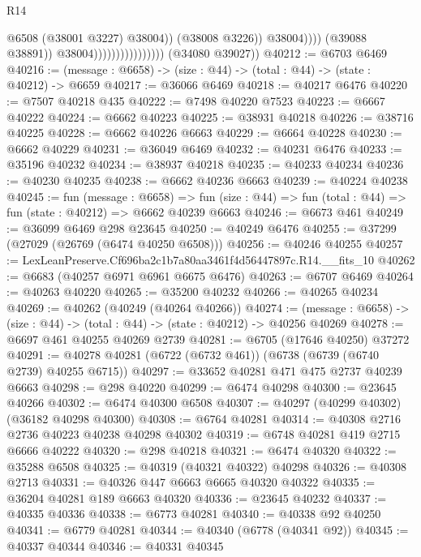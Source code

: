 \begin{lexlean}{R14}
\begin{coremodule}
                                                      @6508
                                                      (@38001 @3227)
                                                      @38004))
                                                  (@38008 @3226))
                                                @38004))))
                                        (@39088 @38891))
                                      @38004))))))))))))))))
      (@34080 @39027))
@40212 := @6703 @6469
@40216 := (message : @6658) -> (size : @44) -> (total : @44) -> (state : @40212) -> @6659
@40217 := @36066 @6469
@40218 := @40217 @6476
@40220 := @7507 @40218 @435
@40222 := @7498 @40220 @7523
@40223 := @6667 @40222
@40224 := @6662 @40223
@40225 := @38931 @40218
@40226 := @38716 @40225
@40228 := @6662 @40226 @6663
@40229 := @6664 @40228
@40230 := @6662 @40229
@40231 := @36049 @6469
@40232 := @40231 @6476
@40233 := @35196 @40232
@40234 := @38937 @40218
@40235 := @40233 @40234
@40236 := @40230 @40235
@40238 := @6662 @40236 @6663
@40239 := @40224 @40238
@40245 := fun (message : @6658) =>
  fun (size : @44) => fun (total : @44) => fun (state : @40212) => @6662 @40239 @6663
@40246 := @6673 @461
@40249 := @36099 @6469 @298 @23645
@40250 := @40249 @6476
@40255 := @37299 (@27029 (@26769 (@6474 @40250 @6508)))
@40256 := @40246 @40255
@40257 := LexLeanPreserve.Cf696ba2c1b7a80aa3461f4d56447897c.R14.__fits_10
@40262 := @6683 (@40257 @6971 @6961 @6675 @6476)
@40263 := @6707 @6469
@40264 := @40263 @40220
@40265 := @35200 @40232
@40266 := @40265 @40234
@40269 := @40262 (@40249 (@40264 @40266))
@40274 := (message : @6658) -> (size : @44) -> (total : @44) -> (state : @40212) -> @40256 @40269
@40278 := @6697 @461 @40255 @40269 @2739
@40281 := @6705 (@17646 @40250) @37272
@40291 := @40278 @40281 (@6722 (@6732 @461)) (@6738 (@6739 (@6740 @2739) @40255 @6715))
@40297 := @33652 @40281 @471 @475 @2737 @40239 @6663
@40298 := @298 @40220
@40299 := @6474 @40298
@40300 := @23645 @40266
@40302 := @6474 @40300 @6508
@40307 := @40297 (@40299 @40302) (@36182 @40298 @40300)
@40308 := @6764 @40281
@40314 := @40308 @2716 @2736 @40223 @40238 @40298 @40302
@40319 := @6748 @40281 @419 @2715 @6666 @40222
@40320 := @298 @40218
@40321 := @6474 @40320
@40322 := @35288 @6508
@40325 := @40319 (@40321 @40322) @40298
@40326 := @40308 @2713
@40331 := @40326 @447 @6663 @6665 @40320 @40322
@40335 := @36204 @40281 @189 @6663 @40320
@40336 := @23645 @40232
@40337 := @40335 @40336
@40338 := @6773 @40281
@40340 := @40338 @92 @40250
@40341 := @6779 @40281
@40344 := @40340 (@6778 (@40341 @92))
@40345 := @40337 @40344
@40346 := @40331 @40345

\end{coremodule}
\end{lexlean}
